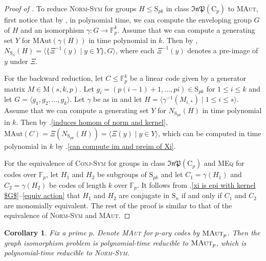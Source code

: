 \documentclass[11pt,a4paper]{article}
\newtheorem{corollary}[theorem]{Corollary}
\theoremstyle{definition}
\theoremstyle{remark}
\newcommand{\InP}{\mathfrak{InP}}
\newcommand{\MAut}{\mathrm{MAut}}
\newcommand{\Sy}{\mathrm{S}}
\newcommand{\Cy}{\mathrm{C}}
\begin{document}
\begin{proof} [Proof of ]
To reduce \textsc{Norm-Sym} for groups $H \leq \Sy_{pk}$ in class $\InP(\Cy_p)$ to \textsc{MAut}, first notice that by , in polynomial time, we can compute the enveloping group $G$ of $H$ and an isomorphism $\gamma: G \rightarrow \mathds{F}_p^k$.
Assume that we can compute a generating set $Y$ for $\MAut(\gamma(H))$ in time polynomial in $k$. 
Then by , $N_{\Sy_n}(H) = \langle \{ \Xi^{-1}(y) \mid y \in Y\}, G \rangle$, where each $\Xi^{-1}(y)$ denotes a pre-image of $y$ under $\Xi$.

For the backward reduction, let $C\leq \mathds{F}_p^{k}$ be a linear code given by a generator matrix $M \in \mathrm{M}(s,k, p)$.
Let $g_i=(p(i-1)+1, \ldots , pi) \in \Sy_{pk}$ for $1 \leq i \leq k$ and let $G = \langle g_1, g_2, \ldots, g_k \rangle$. 
Let $\gamma$ be as in 
and let $H = \langle \gamma^{-1}(M_{i,*}) \mid 1 \leq i \leq s \rangle $.
Assume that we can compute a generating set $Y$ for $N_{\Sy_{pk}}(H)$ in time polynomial in $k$. 
Then by .\ref{induces homom of norm and kernel}, $\MAut(C) = \Xi(N_{\Sy_{pk}}(H)) = \langle \Xi(y) \mid y \in Y\rangle$, which can be computed in time polynomial in $k$ by .\ref{can compute im and preim of Xi}.  

For the equivalence of \textsc{Conj-Sym} for groups in class $\InP(\Cy_p)$ and  \textsc{MEq} for codes over $\mathds{F}_p$, 
let $H_1$ and $H_2$ be subgroups of $\Sy_{pk}$ and let $C_1 = \gamma(H_1)$ and $C_2 = \gamma(H_2)$ be codes of length $k$ over $\mathds{F}_p$. It follows from .\ref{xi is epi with kernel $G$}--\ref{equiv action} that $H_1$ and $H_2$ are conjugate in $\Sy_n$ if and only if $C_1$ and $C_2$ are monomially equivalent. The rest of the proof is similar to that of the equivalence of \textsc{Norm-Sym} and \textsc{MAut}. 
\end{proof}


\begin{corollary} \label{cor: rel complexity}
Fix a prime $p$. Denote \textsc{MAut} for $p$-ary codes by $\textsc{MAut}_p$. Then the graph isomorphism problem is polynomial-time reducible to $\textsc{MAut}_p$, which is polynomial-time reducible to \textsc{Norm-Sym}. 
\end{corollary}
\end{document}

